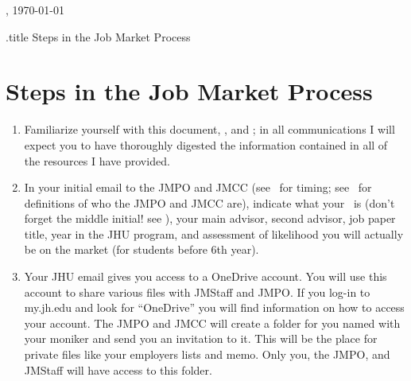 \documentclass{\classes/econtex}
\begin{document}
\hfill{\tiny \jobname, \today} \vspace{0.1in}

\begin{verbatimwrite}{\jobname.title}
  Steps in the Job Market Process
\end{verbatimwrite}

\section*{\Large Steps in the Job Market Process}\medskip\medskip

\begin{enumerate}
\item Familiarize yourself with this document, \timet, and \faq; in all communications I will expect you
  to have thoroughly digested the information contained in all of the resources
  I have provided.

\item In your initial email to the JMPO and JMCC (see \timet~for timing; see \ntn~for definitions of who the JMPO and JMCC are), indicate what your \Moniker~is (don't forget the middle initial!  see \Notation), your main advisor, second advisor, job paper title,
  year in the JHU program, and assessment of likelihood you will
  actually be on the market (for students before 6th year).
  
  \hypertarget{OneDrive}{}
\item Your JHU email gives you access to a OneDrive account. You will use this account to share various files with JMStaff and JMPO. If you log-in to my.jh.edu and look for ``OneDrive'' you will find information on how to access your account. The JMPO and JMCC will create a folder for you named with your moniker and send you an invitation to it. This will be the place for private files like your employers lists and memo. Only you, the JMPO, and JMStaff will have access to this folder.


\end{enumerate}
\end{document}
